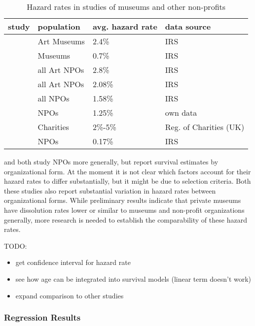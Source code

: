\documentclass[11pt]{article}
\begin{document}
\begin{table}[htbp]
\caption{\label{tbl:litreview}Hazard rates in studies of museums and other non-profits}
\centering
\begin{tabular}{llll}
\hline
study & population & avg. hazard rate & data source\\
\hline
\cite{Hager_2001_vulnerability} & Art Museums & 2.4\% & IRS\\
\cite{Gordon_etal_2013_insolvency} & Museums & 0.7\% & IRS\\
\hline
\cite{Hager_2001_vulnerability} & all Art NPOs & 2.8\% & IRS\\
\cite{Gordon_etal_2013_insolvency} & all Art NPOs & 2.08\% & IRS\\
\cite{Gordon_etal_2013_insolvency} & all NPOs & 1.58\% & IRS\\
\cite{Hager_Galaskiewicz_Larson_2007_liability} & NPOs & 1.25\% & own data\\
\cite{Clifford_2018_reinforcing} & Charities & 2\%-5\% & Reg. of Charities (UK)\\
\cite{Mayer_2022_slimmer} & NPOs & 0.17\% & IRS\\
\hline
\end{tabular}
\end{table}

\textcite{Hager_2001_vulnerability} and \textcite{Gordon_etal_2013_insolvency} both study NPOs more generally, but report survival estimates by organizational form.
At the moment it is not clear which factors account for their hazard rates to differ substantially, but it might be due to selection criteria.
Both these studies also report substantial variation in hazard rates between organizational forms.
While preliminary results indicate that private museums have dissolution rates lower or similar to museums and non-profit organizations generally, more research is needed to establish the comparability of these hazard rates.


\noindent
TODO:
\begin{itemize}
\item get confidence interval for hazard rate
\item see how age can be integrated into survival models (linear term doesn't work)
\item expand comparison to other studies
\end{itemize}



\subsubsection*{Regression Results}
\end{document}
